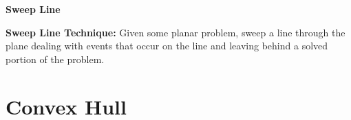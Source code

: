 \documentclass{article}
\begin{document}
%


%
%
%
%

%




\begin{center}
{\large \bf Sweep Line}
\end{center}

\begin{definition}
  \textbf{Sweep Line Technique:} Given some planar problem, sweep a line
through the plane dealing with events that occur on the line and leaving behind a
solved portion of the problem.
\end{definition}


\section{Convex Hull}
\end{document}
